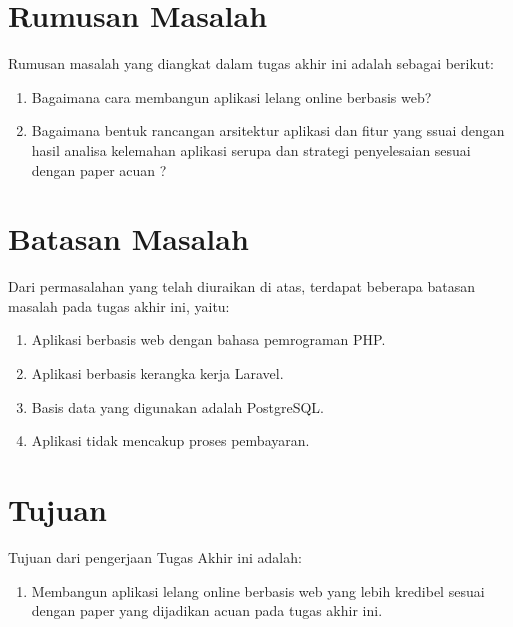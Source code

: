   \section{Rumusan Masalah}
    Rumusan masalah yang diangkat dalam tugas akhir ini adalah sebagai berikut: 
    \begin{enumerate}
      \item Bagaimana cara membangun aplikasi lelang online berbasis web?
      \item Bagaimana bentuk rancangan arsitektur aplikasi dan fitur yang ssuai dengan hasil analisa kelemahan aplikasi serupa dan strategi penyelesaian sesuai dengan paper acuan \cite{ying-feng_kuo_online_2016}?
    \end{enumerate}

  \section{Batasan Masalah}
  	\label{batasan-masalah}
    Dari permasalahan yang telah diuraikan di atas, terdapat beberapa batasan masalah pada tugas akhir ini, yaitu:
    \begin{enumerate}
      \item Aplikasi berbasis web dengan bahasa pemrograman PHP.
      \item Aplikasi berbasis kerangka kerja Laravel.
      \item Basis data yang digunakan adalah PostgreSQL.
      \item Aplikasi tidak mencakup proses pembayaran.
    \end{enumerate}

  \section{Tujuan}
  \label{tujuan}
    Tujuan dari pengerjaan Tugas Akhir ini adalah: 
    \begin{enumerate}
      \item Membangun aplikasi lelang online berbasis web yang lebih kredibel sesuai dengan paper yang dijadikan acuan pada tugas akhir ini. 
    \end{enumerate}
    
    
